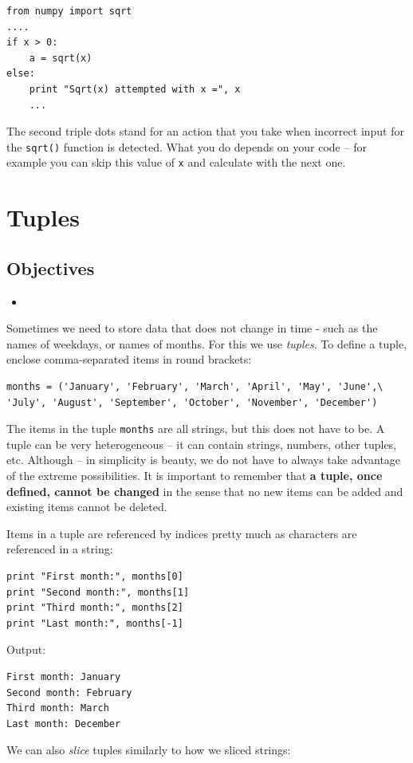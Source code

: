 \begin{verbatim}
from numpy import sqrt
....
if x > 0:
    a = sqrt(x)
else:
    print "Sqrt(x) attempted with x =", x
    ...
\end{verbatim}
The second triple dots stand for an action that you take when incorrect 
input for the {\tt sqrt()} function is detected. What you do depends on 
your code -- for example you can skip this value of {\tt x} and calculate 
with the next one. 

\section{Tuples}

\subsection{Objectives}

\begin{itemize}
\item
\end{itemize}

Sometimes we need to store data that does not change in time - such as 
the names of weekdays, or names of months. For this we use {\em tuples}.
To define a tuple, enclose comma-separated items in round brackets: 

\begin{verbatim}
months = ('January', 'February', 'March', 'April', 'May', 'June',\
'July', 'August', 'September', 'October', 'November', 'December')
\end{verbatim}
The items in the tuple {\tt months} are all strings, but this does not 
have to be. A tuple can be very heterogeneous -- it can contain strings,
numbers, other tuples, etc. Although -- in simplicity is beauty, we
do not have to always take advantage of the extreme possibilities.
It is important to remember that {\bf a tuple, once defined, cannot 
be changed} in the sense that no new items can be added and existing 
items cannot be deleted.

Items in a tuple are referenced by indices pretty much as characters 
are referenced in a string:

\begin{verbatim}
print "First month:", months[0]
print "Second month:", months[1]
print "Third month:", months[2]
print "Last month:", months[-1]
\end{verbatim}
Output:

\begin{verbatim}
First month: January
Second month: February
Third month: March
Last month: December
\end{verbatim}
We can also {\em slice} tuples similarly to how we sliced strings:

